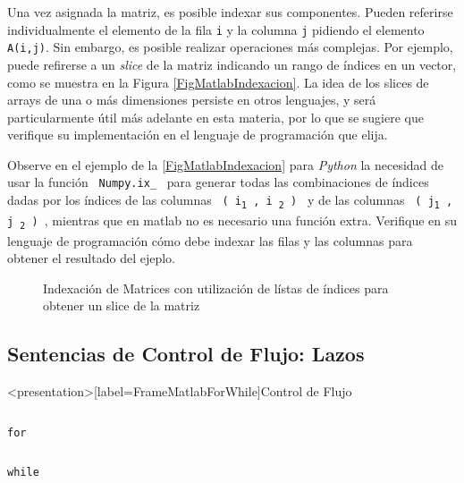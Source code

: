 Una vez asignada la matriz, es posible indexar sus componentes. 
Pueden referirse individualmente el elemento de la fila \texttt{i} y la
columna \texttt{j} pidiendo el elemento \texttt{A(i,j)}. Sin 
embargo, es posible realizar operaciones más complejas. Por ejemplo,
puede refirerse a un \emph{slice} de la matriz indicando un rango 
de índices en un vector, como se muestra en la Figura 
\autoref{FigMatlabIndexacion}. La idea de los slices de arrays de una o 
más dimensiones persiste en otros lenguajes, y será particularmente
útil más adelante en esta materia, por lo que se sugiere que
verifique su implementación en el lenguaje de programación 
que elija. 

Observe en el ejemplo de la \autoref{FigMatlabIndexacion} para \emph{Python}
la necesidad de usar la función \texttt{ Numpy.ix\_ } para generar todas las 
combinaciones de índices dadas por los índices de las columnas 
\texttt{ ( i\textsubscript{1} , i \textsubscript{2} ) }
y de las columnas \texttt{ ( j\textsubscript{1} , j \textsubscript{2} ) }, 
mientras que en matlab no es necesario
una función extra. Verifique en su lenguaje de programación cómo debe indexar 
las filas y las columnas para obtener el resultado del ejeplo. 

\mode*

\begin{figure}
  \caption{ Indexación de Matrices con utilización de lístas de índices para
 obtener un slice de la matriz \label{FigMatlabIndexacion} }
\end{figure}

\mode*

\subsection{Sentencias de Control de Flujo: Lazos}

\begin{frame}<presentation>[label=FrameMatlabForWhile]{Control de Flujo}
\begin{columns}[T]
\hfill \large\texttt{for}

\begin{codeblock}

\end{codeblock}
\end{columns}

\begin{columns}[T]
\hfill \large\texttt{while}

\begin{codeblock}

\end{codeblock}

\end{columns}
\end{frame}

